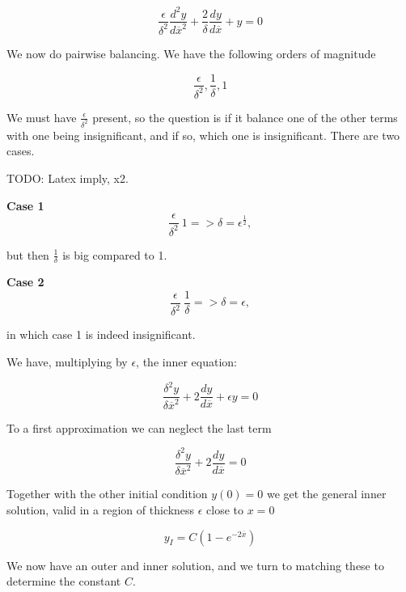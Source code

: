 \documentclass[12pt]{article}
\begin{document}
\begin{equation}
\frac{\epsilon}{\delta^2} \frac{d^2y}{d\overline{x}^2} + \frac{2}{\delta}
\frac{dy}{d\overline{x}} + y = 0
\end{equation}

We now do pairwise balancing. We have the following orders of
magnitude

\begin{equation}
\frac{\epsilon}{\delta^2}, \frac{1}{\delta}, 1
\end{equation}

We must have $\frac{\epsilon}{\delta^2}$ present, so the question is if it
balance one of the other terms with one being insignificant, and if so, which one
is insignificant. There are two cases.

TODO: Latex imply, x2.

\textbf{Case 1}
\begin{equation}
\frac{\epsilon}{\delta^2} ~ 1 => \delta = \epsilon^{\frac{1}{2}},
\end{equation}

but then $\frac{1}{\delta}$ is big compared to 1.

\textbf{Case 2}
\begin{equation}
\frac{\epsilon}{\delta^2} ~ \frac{1}{\delta} => \delta = \epsilon,
\end{equation}

in which case 1 is indeed insignificant.

We have, multiplying by $\epsilon$, the inner equation:

\begin{equation}
\frac{\delta^2 y}{\delta \overline{x}^2} + 2 \frac{dy}{d\overline{x}} + \epsilon
y = 0
\end{equation}

To a first approximation we can neglect the last term

\begin{equation}
\frac{\delta^2 y}{\delta \overline{x}^2} + 2 \frac{dy}{d\overline{x}} = 0
\end{equation}

Together with the other initial condition $y(0)=0$ we get the general inner
solution, valid in a region of thickness $\epsilon$ close to $x=0$

\begin{equation}
y_I = C(1 - e^{-2\overline{x}})
\end{equation}

We now have an outer and inner solution, and we turn to matching these to
determine the constant $C$.
\end{document}
